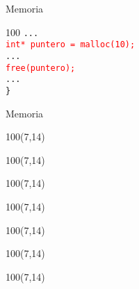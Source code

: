 \documentclass[aspectratio=169]{beamer}
\begin{document}
\begin{frame}[fragile,t]{Memoria}
\begin{textblock}{100}
{    \hspace{0.8cm} \texttt{...}\\
    \hspace{0.8cm} \textcolor{red}{\texttt{int* puntero = malloc(10);}}\\
    \hspace{0.8cm} \texttt{...}\\
    \hspace{0.8cm} \textcolor{red}{\texttt{free(puntero);}}\\
    \hspace{0.8cm} \texttt{...}\\
    \texttt{\}}\\
    }
    \end{textblock}
\end{frame}

\begin{frame}{Memoria}
    \begin{textblock}{100}(7,14)  \end{textblock} %
    \begin{textblock}{100}(7,14)  \end{textblock} %
    \begin{textblock}{100}(7,14)  \end{textblock} %
    \begin{textblock}{100}(7,14)  \end{textblock} %
    \begin{textblock}{100}(7,14)  \end{textblock} %
    \begin{textblock}{100}(7,14)  \end{textblock} %
    \begin{textblock}{100}(7,14)  \end{textblock} %
\end{frame}
\end{document}
